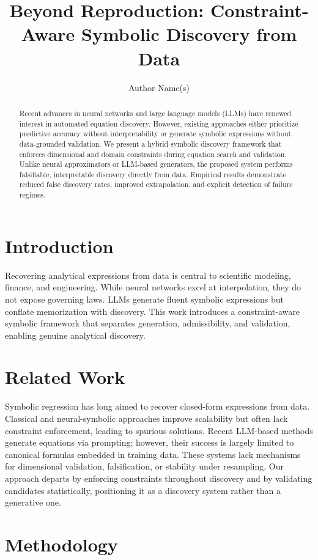 \documentclass[11pt]{article}
\title{Beyond Reproduction: Constraint-Aware Symbolic Discovery from Data}
\author{Author Name(s)}
\date{}
\begin{document}
\maketitle

\begin{abstract}
Recent advances in neural networks and large language models (LLMs) have renewed interest in automated equation discovery. However, existing approaches either prioritize predictive accuracy without interpretability or generate symbolic expressions without data-grounded validation. We present a hybrid symbolic discovery framework that enforces dimensional and domain constraints during equation search and validation. Unlike neural approximators or LLM-based generators, the proposed system performs falsifiable, interpretable discovery directly from data. Empirical results demonstrate reduced false discovery rates, improved extrapolation, and explicit detection of failure regimes.
\end{abstract}

\section{Introduction}
Recovering analytical expressions from data is central to scientific modeling, finance, and engineering. While neural networks excel at interpolation, they do not expose governing laws. LLMs generate fluent symbolic expressions but conflate memorization with discovery. This work introduces a constraint-aware symbolic framework that separates generation, admissibility, and validation, enabling genuine analytical discovery.

\section{Related Work}
Symbolic regression has long aimed to recover closed-form expressions from data. Classical and neural-symbolic approaches improve scalability but often lack constraint enforcement, leading to spurious solutions. Recent LLM-based methods generate equations via prompting; however, their success is largely limited to canonical formulas embedded in training data. These systems lack mechanisms for dimensional validation, falsification, or stability under resampling. Our approach departs by enforcing constraints throughout discovery and by validating candidates statistically, positioning it as a discovery system rather than a generative one.

\section{Methodology}
\end{document}
